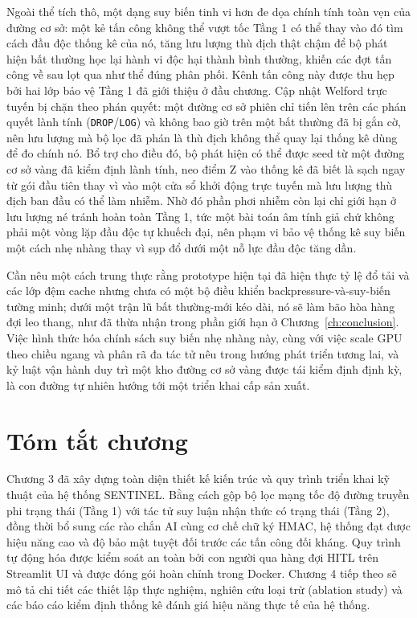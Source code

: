 Ngoài thể tích thô, một dạng suy biến tinh vi hơn đe dọa chính tính toàn vẹn của đường cơ sở: một kẻ tấn công không thể vượt tốc Tầng 1 có thể thay vào đó tìm cách đầu độc thống kê của nó, tăng lưu lượng thù địch thật chậm để bộ phát hiện bất thường học lại hành vi độc hại thành bình thường, khiến các đợt tấn công về sau lọt qua như thể đúng phân phối. Kênh tấn công này được thu hẹp bởi hai lớp bảo vệ Tầng 1 đã giới thiệu ở đầu chương. Cập nhật Welford trực tuyến bị chặn theo phán quyết: một đường cơ sở phiên chỉ tiến lên trên các phán quyết lành tính (\texttt{DROP}/\texttt{LOG}) và không bao giờ trên một bất thường đã bị gắn cờ, nên lưu lượng mà bộ lọc đã phán là thù địch không thể quay lại thống kê dùng để đo chính nó. Bổ trợ cho điều đó, bộ phát hiện có thể được seed từ một đường cơ sở vàng đã kiểm định lành tính, neo điểm Z vào thống kê đã biết là sạch ngay từ gói đầu tiên thay vì vào một cửa sổ khởi động trực tuyến mà lưu lượng thù địch ban đầu có thể làm nhiễm. Nhờ đó phần phơi nhiễm còn lại chỉ giới hạn ở lưu lượng né tránh hoàn toàn Tầng 1, tức một bài toán âm tính giả chứ không phải một vòng lặp đầu độc tự khuếch đại, nên phạm vi bảo vệ thống kê suy biến một cách nhẹ nhàng thay vì sụp đổ dưới một nỗ lực đầu độc tăng dần.

Cần nêu một cách trung thực rằng prototype hiện tại đã hiện thực tỷ lệ đổ tải và các lớp đệm cache nhưng chưa có một bộ điều khiển backpressure-và-suy-biến tường minh; dưới một trận lũ bất thường-mới kéo dài, nó sẽ làm bão hòa hàng đợi leo thang, như đã thừa nhận trong phần giới hạn ở Chương~\ref{ch:conclusion}. Việc hình thức hóa chính sách suy biến nhẹ nhàng này, cùng với việc scale GPU theo chiều ngang và phân rã đa tác tử nêu trong hướng phát triển tương lai, và kỷ luật vận hành duy trì một kho đường cơ sở vàng được tái kiểm định định kỳ, là con đường tự nhiên hướng tới một triển khai cấp sản xuất.

\section{Tóm tắt chương}

Chương 3 đã xây dựng toàn diện thiết kế kiến trúc và quy trình triển khai kỹ thuật của hệ thống SENTINEL. Bằng cách gộp bộ lọc mạng tốc độ đường truyền phi trạng thái (Tầng 1) với tác tử suy luận nhận thức có trạng thái (Tầng 2), đồng thời bổ sung các rào chắn AI cùng cơ chế chữ ký HMAC, hệ thống đạt được hiệu năng cao và độ bảo mật tuyệt đối trước các tấn công đối kháng. Quy trình tự động hóa được kiểm soát an toàn bởi con người qua hàng đợi HITL trên Streamlit UI và được đóng gói hoàn chỉnh trong Docker. Chương 4 tiếp theo sẽ mô tả chi tiết các thiết lập thực nghiệm, nghiên cứu loại trừ (ablation study) và các báo cáo kiểm định thống kê đánh giá hiệu năng thực tế của hệ thống.
